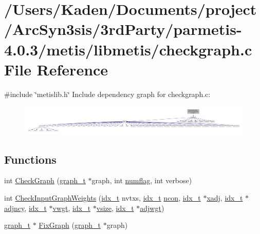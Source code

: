 \hypertarget{a00179}{}\section{/\+Users/\+Kaden/\+Documents/project/\+Arc\+Syn3sis/3rd\+Party/parmetis-\/4.0.3/metis/libmetis/checkgraph.c File Reference}
\label{a00179}
{\ttfamily \#include \char`\"{}metislib.\+h\char`\"{}}\newline
Include dependency graph for checkgraph.\+c\+:\nopagebreak
\begin{figure}[H]
\begin{center}
\leavevmode
\includegraphics[width=350pt]{a00180}
\end{center}
\end{figure}
\subsection*{Functions}
\begin{DoxyCompactItemize}
\item 
int \hyperlink{a00179_a3fb602d633b7a36fa4027c192ed7eb45}{Check\+Graph} (\hyperlink{a00734}{graph\+\_\+t} $\ast$graph, int \hyperlink{a00879_aa48ecaf34ec788199c3aedb2b1558eb7}{numflag}, int verbose)
\item 
int \hyperlink{a00179_aeafd137b3625206526f200a7d8a8c3df}{Check\+Input\+Graph\+Weights} (\hyperlink{a00876_aaa5262be3e700770163401acb0150f52}{idx\+\_\+t} nvtxs, \hyperlink{a00876_aaa5262be3e700770163401acb0150f52}{idx\+\_\+t} \hyperlink{a00879_ac1dd31740e8f97fb57dc917ded30253f}{ncon}, \hyperlink{a00876_aaa5262be3e700770163401acb0150f52}{idx\+\_\+t} $\ast$\hyperlink{a00879_aa8fc7f75458e38e1e2979ed6db639164}{xadj}, \hyperlink{a00876_aaa5262be3e700770163401acb0150f52}{idx\+\_\+t} $\ast$\hyperlink{a00879_a20c068e3ebdd8f9889fb82c1f677d679}{adjncy}, \hyperlink{a00876_aaa5262be3e700770163401acb0150f52}{idx\+\_\+t} $\ast$\hyperlink{a00879_a34203f1160d94eca83e95f2718ea3504}{vwgt}, \hyperlink{a00876_aaa5262be3e700770163401acb0150f52}{idx\+\_\+t} $\ast$\hyperlink{a00879_aac32df5bb22250d94fc2fc7e4078308b}{vsize}, \hyperlink{a00876_aaa5262be3e700770163401acb0150f52}{idx\+\_\+t} $\ast$\hyperlink{a00879_a2be4719baa820cfa5c06fd070796e0d3}{adjwgt})
\item 
\hyperlink{a00734}{graph\+\_\+t} $\ast$ \hyperlink{a00179_a681b2f4a615da39347c928c127760d07}{Fix\+Graph} (\hyperlink{a00734}{graph\+\_\+t} $\ast$graph)
\end{DoxyCompactItemize}


